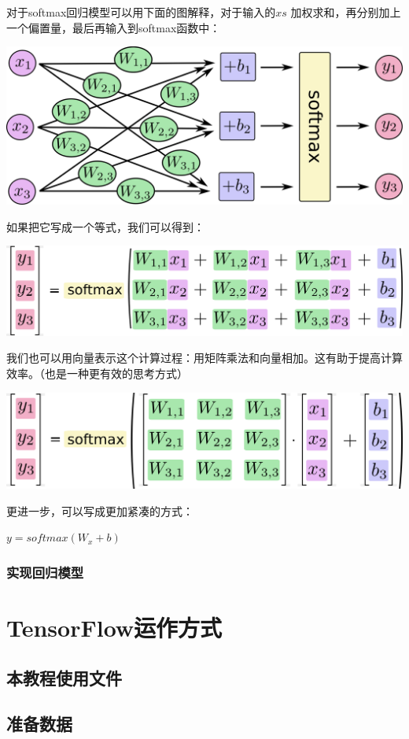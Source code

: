 \documentclass[a4paper,11pt,twoside]{ctexart}
\begin{document}
对于softmax回归模型可以用下面的图解释，对于输入的$xs$ 加权求和，再分别加上一个偏置量，最后再输入到softmax函数中：

\includegraphics[width=.75\textwidth]{../SOURCE/images/softmax-regression-scalargraph.png}

如果把它写成一个等式，我们可以得到：

\includegraphics[width=.75\textwidth]{../SOURCE/images/softmax-regression-scalarequation.png}

我们也可以用向量表示这个计算过程：用矩阵乘法和向量相加。这有助于提高计算效率。（也是一种更有效的思考方式）

\includegraphics[width=.75\textwidth]{../SOURCE/images/softmax-regression-vectorequation.png}

更进一步，可以写成更加紧凑的方式：

$y = softmax(W_x+b)$

\subsubsection {实现回归模型}


\section{TensorFlow运作方式}

\subsection {本教程使用文件}
\subsection {准备数据}
\end{document}
